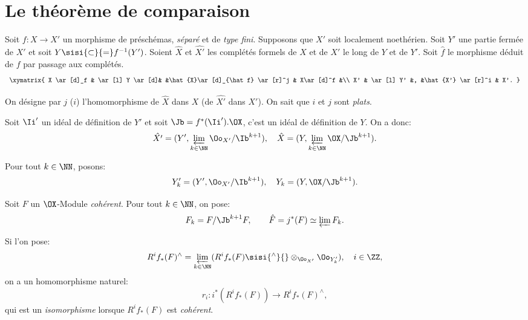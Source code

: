 \section{Le th\'eor\`eme de comparaison} \label{IX.1}

Soit $f\colon X\to X'$ un morphisme de pr\'esch\'emas, \emph{s\'epar\'e} et de \emph{type fini}. Supposons que $X'$ soit localement noeth\'erien. Soit $Y'$ une partie ferm\'ee de $X'$ et soit $Y\sisi{\subset}{=} f^{-1}(Y')$. Soient $\hat{X}$ et $\hat{X'}$ les compl\'et\'es formels de $X$ et de $X'$ le long de $Y$ et de $Y'$. Soit $\hat{f}$ le morphisme d\'eduit de $f$ par passage aux compl\'et\'es.
\begin{equation} \label{eq:IX.1.1}
\begin{array}{c}
\xymatrix{ X \ar[d]_f & \ar[l] Y \ar[d]& &\hat{X}\ar[d]_{\hat f} \ar[r]^j & X\ar[d]^f &\\
X' & \ar[l] Y' &, &\hat{X'} \ar[r]^i & X'.
}
\end{array}
\end{equation}

On d\'esigne par $j$ (\resp $i$) l'homomorphisme de $\hat{X}$ dans $X$ (\resp de $\hat{X'}$ dans $X'$). On sait que $i$ et $j$ sont \emph{plats}.

Soit $\Ii '$ un id\'eal de d\'efinition de $Y'$ et soit ${\Jb}=f^{*}(\Ii '). \OX$, c'est un id\'eal de d\'efinition de $Y$. On a donc:
\begin{equation} \label{eq:IX.1.2} {\hat{X'}=(Y', \varprojlim_{k \in \NN}\Oo_{X'}/{{\Ib}^{k+1}})}, \quad {\hat{X}=(Y, \varprojlim_{k \in \NN}\OX/{{\Jb}^{k+1}})}.
\end{equation}

Pour tout $k \in \NN$, posons:
\begin{equation} \label{eq:IX.1.3} Y'_k=(Y', \Oo_{X'}/{{\Ib}^{k+1}}), \quad {Y_k}=(Y, \OX/{{\Jb}^{k+1}}).
\end{equation}

Soit $F$ un $\OX$-Module \emph{coh\'erent}. Pour tout $k \in \NN$, on pose:
\begin{equation} \label{eq:IX.1.4} F_k=F/{\Jb}^{k+1}F, \qquad \hat{F}=j^*(F)\simeq \varprojlim F_k.
\end{equation}

Si l'on pose\pageoriginaled:
\begin{equation} \label{eq:IX.1.5} R^i f_*(F)^{\wedge}=\varprojlim_{k \in \NN} (R^i f_*(F)\sisi{^{\wedge}}{} \otimes_{{\Oo}_{X'}}{\Oo}_{Y'_k}), \quad i \in \ZZ,
\end{equation}
on a un homomorphisme naturel:
\begin{equation} \label{eq:IX.1.6} r_i: i^*(R^if_*(F)) \to R^i f_*(F)^{\wedge},
\end{equation}
qui est un \emph{isomorphisme} lorsque $ R^i f_*(F)$ est \emph{coh\'erent}.

